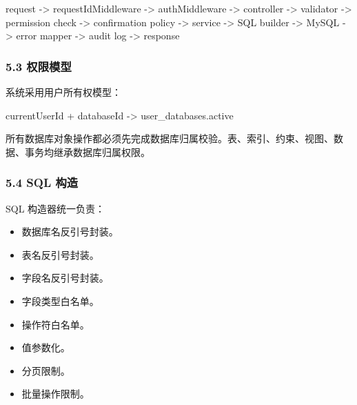 \documentclass[
  a4paper,
  UTF8]{ctexart}
\newenvironment{Shaded}{}{}
\newcommand{\NormalTok}[1]{#1}
\providecommand{\tightlist}{%
  \setlength{\itemsep}{0pt}\setlength{\parskip}{0pt}}
\begin{document}
\begin{Shaded}
\begin{Highlighting}[]
\NormalTok{request}
\NormalTok{  {-}\textgreater{} requestIdMiddleware}
\NormalTok{  {-}\textgreater{} authMiddleware}
\NormalTok{  {-}\textgreater{} controller}
\NormalTok{  {-}\textgreater{} validator}
\NormalTok{  {-}\textgreater{} permission check}
\NormalTok{  {-}\textgreater{} confirmation policy}
\NormalTok{  {-}\textgreater{} service}
\NormalTok{  {-}\textgreater{} SQL builder}
\NormalTok{  {-}\textgreater{} MySQL}
\NormalTok{  {-}\textgreater{} error mapper}
\NormalTok{  {-}\textgreater{} audit log}
\NormalTok{  {-}\textgreater{} response}
\end{Highlighting}
\end{Shaded}

\hypertarget{ux6743ux9650ux6a21ux578b}{%
\subsubsection{5.3 权限模型}\label{ux6743ux9650ux6a21ux578b}}

系统采用用户所有权模型：

\begin{Shaded}
\begin{Highlighting}[]
\NormalTok{currentUserId + databaseId {-}\textgreater{} user\_databases.active}
\end{Highlighting}
\end{Shaded}

所有数据库对象操作都必须先完成数据库归属校验。表、索引、约束、视图、数据、事务均继承数据库归属权限。

\hypertarget{sql-ux6784ux9020}{%
\subsubsection{5.4 SQL 构造}\label{sql-ux6784ux9020}}

SQL 构造器统一负责：

\begin{itemize}
\tightlist
\item
  数据库名反引号封装。
\item
  表名反引号封装。
\item
  字段名反引号封装。
\item
  字段类型白名单。
\item
  操作符白名单。
\item
  值参数化。
\item
  分页限制。
\item
  批量操作限制。
\end{itemize}
\end{document}
